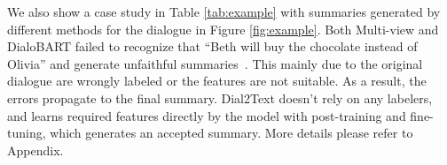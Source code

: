 We also show a case study in Table \ref{tab:example} with summaries generated by different methods for the dialogue in Figure \ref{fig:example}. Both Multi-view and DialoBART failed to recognize that ``Beth will buy the chocolate instead of Olivia'' and generate unfaithful summaries~\cite{maynez2020faithfulness,cao2018faithful}. This mainly due to the original dialogue are wrongly labeled or the features are not suitable. As a result, the errors propagate to the final summary. Dial2Text doesn't rely on any labelers, and learns required features directly by the model with post-training and fine-tuning, which generates an accepted summary. More details please refer to Appendix.




